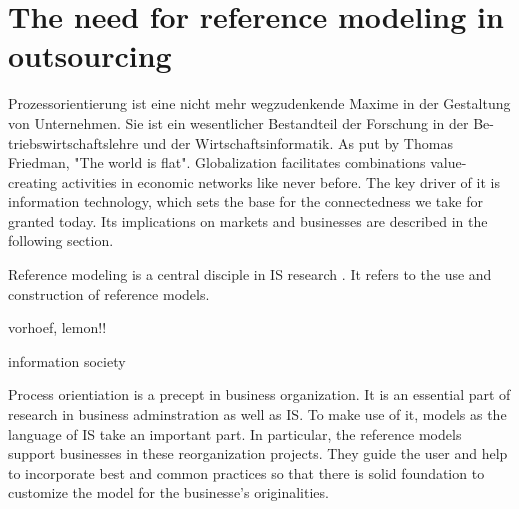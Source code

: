 \chapter{The need for reference modeling in outsourcing}

Prozessorientierung ist eine nicht mehr wegzudenkende Maxime in der Gestaltung von Unternehmen. Sie ist ein wesentlicher Bestandteil der Forschung in der Be- triebswirtschaftslehre und der Wirtschaftsinformatik.
As put by Thomas Friedman, "The world is flat". Globalization facilitates combinations value-creating activities in economic networks like never before. The key driver of it is information technology, which sets the base for the connectedness we take for granted today. Its implications on markets and businesses are described in the following section. 

Reference modeling is a central disciple in IS research \cite{Fettke2004, konig1996entwicklung, becker2004handelsinformationssysteme}. It refers to the use and construction of reference models.

vorhoef, lemon!!

information society


Process orientiation is a precept in business organization. It is an essential part of research in business adminstration as well as \acrfull{IS}. To make use of it, models as the language of \acrshort{IS} take an important part. In particular, the reference models support businesses in these reorganization projects. They guide the user and help to incorporate best and common practices so that there is solid foundation to customize the model for the businesse's originalities.  

